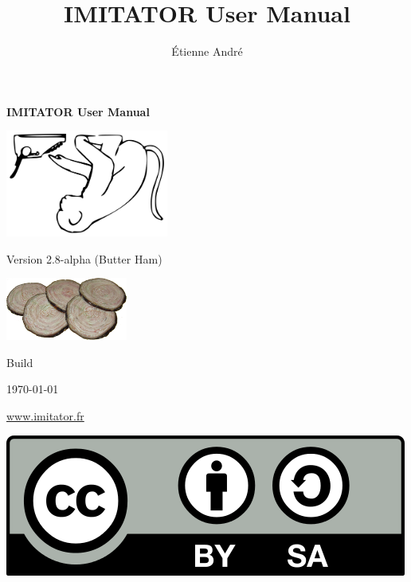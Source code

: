 \documentclass[a4paper,11pt]{report}
\title{IMITATOR User Manual}
\author{Étienne André}
\newcommand{\imitatorversion}{2.8-alpha}
\newcommand{\imitatorversionname}{Butter Ham}
\begin{document}

\sloppy


\thispagestyle{empty}

\mbox{}

\vspace{2cm}

\begin{center}
	{\Huge \bfseries IMITATOR User Manual}

	\vspace{2cm}

	\includegraphics[width=0.40\textwidth]{../logos/imitator-500.png}

	\vspace{2cm}
	
	{\Large Version \imitatorversion{} (\imitatorversionname{})}
	
	\medskip
	
	\includegraphics[width=0.30\textwidth]{../logos/logo2-7-300.png}

\end{center}

\vspace{2cm}

{\small \hfill{}Build }

{\small \hfill{}\today{}}

\vspace{2cm}

\begin{center}
 	{\Large \url{www.imitator.fr}}
 	
\end{center}
\hfill\includegraphics[width=.15\textwidth]{images/CC-BY-SA_500.png}
\end{document}
